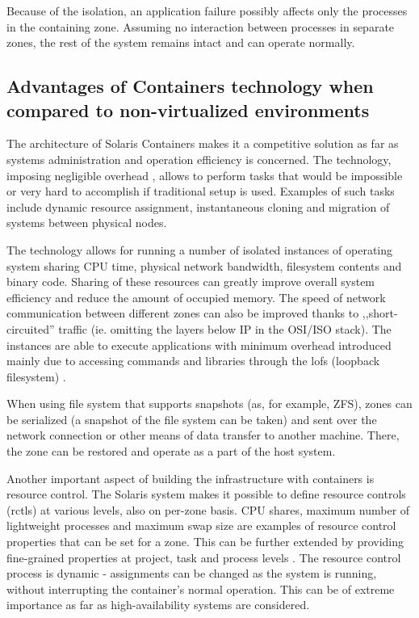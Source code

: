 \documentclass[11pt]{book}
\begin{document}
        Because of the isolation, an application failure possibly affects only the processes in the containing zone.
        Assuming no interaction between processes in separate zones, the rest of the system remains intact and can
        operate normally.
        
      

      \subsection{Advantages of Containers technology when compared to non-virtualized environments}
      \label{sub:}

        The architecture of Solaris Containers makes it a competitive solution as far as systems administration and
        operation efficiency is concerned. The technology, imposing negligible overhead \cite{price}, allows to perform
        tasks that would be impossible or very hard to accomplish if traditional setup is used. Examples of such tasks
        include dynamic resource assignment, instantaneous cloning and migration of systems between physical nodes.

        The technology allows for running a number of isolated instances of operating system sharing CPU time,
        physical network bandwidth, filesystem contents and binary code. Sharing of these resources can greatly improve
        overall system efficiency and reduce the amount of occupied memory. The speed of network communication between
        different zones can also be improved thanks to ,,short-circuited'' traffic (ie. omitting the layers below IP in
        the OSI/ISO stack). The instances are able to execute applications with minimum overhead introduced mainly due
        to accessing commands and libraries through the lofs (loopback filesystem) \cite{price,fsag}.

        When using file system that supports snapshots (as, for example, ZFS), zones can be
        serialized (a snapshot of the file system can be taken) and sent over the network connection or other means of
        data transfer to another machine. There, the zone can be restored and operate as a part of the host system.

        Another important aspect of building the infrastructure with containers is resource control. The Solaris system
        makes it possible to define resource controls (rctls) at various levels, also on per-zone basis. CPU shares,
        maximum number of lightweight processes and maximum swap size are examples of resource control properties that
        can be set for a zone. This can be further extended by providing fine-grained properties at project, task and
        process levels \cite{sag}. The resource control process is dynamic - assignments can be changed as the system
        is running, without interrupting the container's normal operation. This can be of extreme importance as far
        as high-availability systems are considered.
\end{document}
